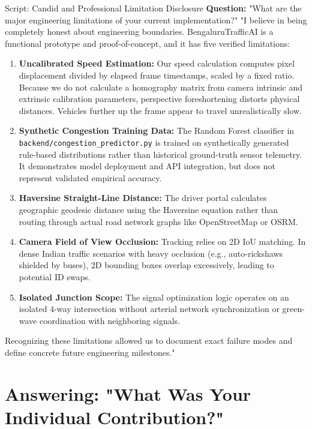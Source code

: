 \begin{interviewq}{Script: Candid and Professional Limitation Disclosure}
\textbf{Question:} "What are the major engineering limitations of your current implementation?"
\tcblower
"I believe in being completely honest about engineering boundaries. BengaluruTrafficAI is a functional prototype and proof-of-concept, and it has five verified limitations:

\begin{enumerate}
    \item \textbf{Uncalibrated Speed Estimation:} Our speed calculation computes pixel displacement divided by elapsed frame timestamps, scaled by a fixed ratio. Because we do not calculate a homography matrix from camera intrinsic and extrinsic calibration parameters, perspective foreshortening distorts physical distances. Vehicles further up the frame appear to travel unrealistically slow.
    \item \textbf{Synthetic Congestion Training Data:} The Random Forest classifier in \texttt{backend/congestion\_predictor.py} is trained on synthetically generated rule-based distributions rather than historical ground-truth sensor telemetry. It demonstrates model deployment and API integration, but does not represent validated empirical accuracy.
    \item \textbf{Haversine Straight-Line Distance:} The driver portal calculates geographic geodesic distance using the Haversine equation rather than routing through actual road network graphs like OpenStreetMap or OSRM.
    \item \textbf{Camera Field of View Occlusion:} Tracking relies on 2D IoU matching. In dense Indian traffic scenarios with heavy occlusion (e.g., auto-rickshaws shielded by buses), 2D bounding boxes overlap excessively, leading to potential ID swaps.
    \item \textbf{Isolated Junction Scope:} The signal optimization logic operates on an isolated 4-way intersection without arterial network synchronization or green-wave coordination with neighboring signals.
\end{enumerate}
Recognizing these limitations allowed us to document exact failure modes and define concrete future engineering milestones."
\end{interviewq}

\section{Answering: "What Was Your Individual Contribution?"}
\label{sec:script_contribution}

